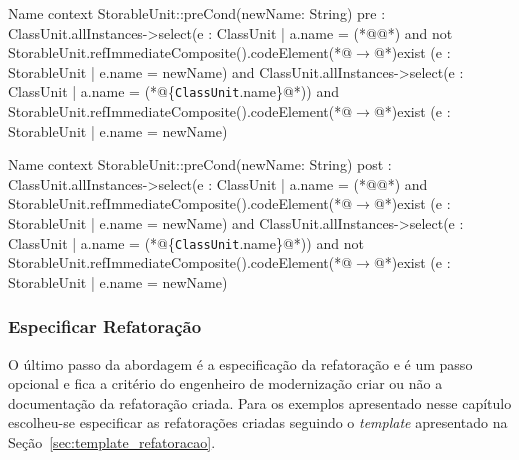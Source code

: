 \begin{codigo}[caption={[Pré-condição da refatoração \textit{Push Down Attribute}.] Pré-condição da refatoração \textit{Push Down Attribute}.},escapeinside={(*@}{@*)}, basicstyle=\footnotesize, label={codigo:precondicao_push_down_attribute}, language=OCL]{Name}
context StorableUnit::preCond(newName: String)
pre : ClassUnit.allInstances->select(e : ClassUnit | a.name = (*@@*) and not StorableUnit.refImmediateComposite().codeElement(*@$\rightarrow$@*)exist (e : StorableUnit | e.name = newName) 
and ClassUnit.allInstances->select(e : ClassUnit | a.name = (*@\{\texttt{ClassUnit}.name\}@*)) and StorableUnit.refImmediateComposite().codeElement(*@$\rightarrow$@*)exist (e : StorableUnit | e.name = newName)
\end{codigo}

\begin{codigo}[caption={[Pós-condição da refatoração \textit{Push Down Attribute}.] Pós-condição da refatoração \textit{Push Down Attribute}.},escapeinside={(*@}{@*)}, basicstyle=\footnotesize, label={codigo:poscondicao_push_down_attribute2}, language=OCL]{Name}
context StorableUnit::preCond(newName: String)
post : ClassUnit.allInstances->select(e : ClassUnit | a.name = (*@@*) and StorableUnit.refImmediateComposite().codeElement(*@$\rightarrow$@*)exist (e : StorableUnit | e.name = newName) 
and ClassUnit.allInstances->select(e : ClassUnit | a.name = (*@\{\texttt{ClassUnit}.name\}@*)) and not StorableUnit.refImmediateComposite().codeElement(*@$\rightarrow$@*)exist (e : StorableUnit | e.name = newName)
\end{codigo}


\subsubsection{Especificar Refatoração}

O último passo da abordagem é a especificação da refatoração e é um passo opcional e fica a critério do engenheiro de modernização criar ou não a documentação da refatoração criada. Para os exemplos apresentado nesse capítulo escolheu-se especificar as refatorações criadas seguindo o \textit{template} apresentado na Seção~\ref{sec:template_refatoracao}.

